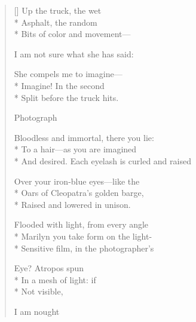 \begin{verse}[\versewidth]
Up the truck, the wet\\*
Asphalt, the random\\*
Bits of color and movement---

I am not sure what she has said:

She compels me to imagine---\\*
Imagine!   In the second\\*
Split before the truck hits.

 \qquad Photograph

Bloodless and immortal, there you lie:\\*
To a hair---as you are imagined\\*
And desired.   Each eyelash is curled and raised

Over your iron-blue eyes---like the\\*
Oars of Cleopatra's golden barge,\\*
Raised and lowered in unison.

Flooded with light, from every angle\\*
Marilyn you take form on the light-\\*
Sensitive film, in the photographer's

Eye?    Atropos spun\\*
In a mesh of light:  if\\*
Not visible,

I am nought
\end{verse}
